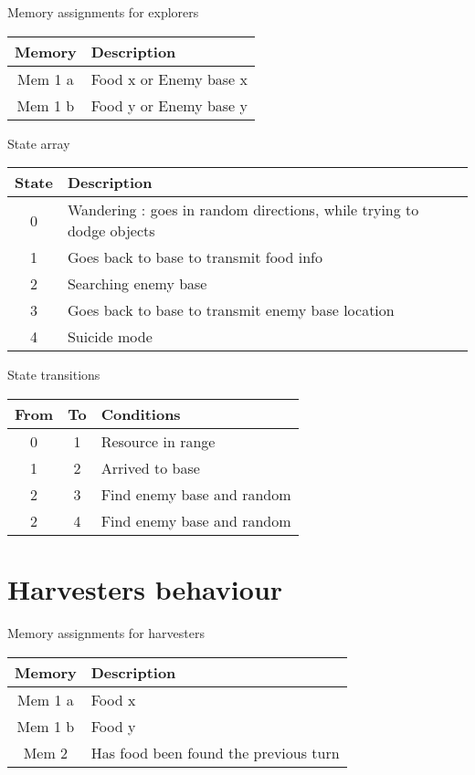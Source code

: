 \documentclass{article}
\begin{document}
\begin{table}[ht]
	Memory assignments for explorers\\
	\begin{tabular}{|c|l|}
		\hline
		Memory & Description\\
		\hline
		Mem 1 a & Food x or Enemy base x\\
		Mem 1 b & Food y or Enemy base y\\
		\hline
	\end{tabular}
\end{table}

\begin{table}[ht]
	State array\\
	\begin{tabular}{|c|l|}
		\hline
		State & Description \\
		\hline
		0 & Wandering : goes in random directions, while trying to dodge objects\\
		\hline
		1 & Goes back to base to transmit food info\\
		\hline
		2 & Searching enemy base\\
		\hline
		3 & Goes back to base to transmit enemy base location\\
		\hline
		4 & Suicide mode\\
		\hline
	\end{tabular}
\end{table}

\begin{table}[ht]
	State transitions\\
	\begin{tabular}{|c|c|l|}
		\hline
		From & To & Conditions\\
		\hline
		0 & 1 & Resource in range\\
		\hline
		1 & 2 & Arrived to base\\
		\hline
		2 & 3 & Find enemy base and random\\
		\hline
		2 & 4 & Find enemy base and random\\
		\hline
	\end{tabular}
\end{table}

\section{Harvesters behaviour}

\begin{table}[ht]
	Memory assignments for harvesters\\
	\begin{tabular}{|c|l|}
		\hline
		Memory & Description\\
		\hline
		Mem 1 a & Food x\\
		Mem 1 b & Food y\\
		\hline
                Mem 2 & Has food been found the previous turn\\
                \hline
	\end{tabular}
\end{table}
\end{document}
